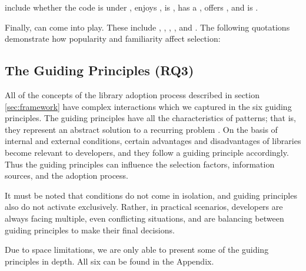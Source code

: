  include whether the code is under , enjoys , is , has a , offers , and is . 

Finally,  can come into play. These include , , , , and . The following quotations demonstrate how popularity and familiarity affect selection:


\subsection{The Guiding Principles (RQ3)}
\label{sec:gp}

All of the concepts of the library adoption process described in section \ref{sec:framework} have complex interactions which we captured in the six guiding principles.  The guiding principles have all the characteristics of patterns; that is, they represent an abstract solution to a recurring problem \cite{riehle:2021:pattern}. On the basis of internal and external conditions, certain advantages and disadvantages of libraries become relevant to developers, and they follow a guiding principle accordingly. Thus the guiding principles can influence the selection factors, information sources, and the adoption process. 


It must be noted that conditions do not come in isolation, and guiding principles also do not activate exclusively. Rather, in practical scenarios, developers are always facing multiple, even conflicting situations, and are balancing between guiding principles to make their final decisions.

Due to space limitations, we are only able to present some of the guiding principles in depth. All six can be found in the Appendix.



